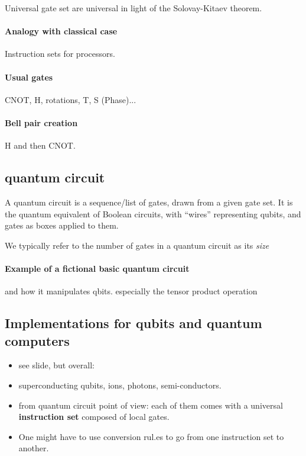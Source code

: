 \documentclass{article}
\begin{document}
Universal gate set are universal in light of the Solovay-Kitaev theorem.

\paragraph{Analogy with classical case} Instruction sets for processors.

\paragraph{Usual gates} CNOT, H, rotations, T, S (Phase)... 

\paragraph{Bell pair creation} H and then CNOT.

\subsection{quantum circuit}

A quantum circuit is a sequence/list of gates, drawn from a given gate set. It is the quantum
equivalent of Boolean circuits, with ``wires'' representing qubits, and gates as boxes
applied to them.

We typically refer to the number of gates in a quantum circuit as its \emph{size}

\paragraph{Example of a fictional basic quantum circuit} and how it manipulates
qbits. especially the tensor product operation

\subsection{Implementations for qubits and quantum computers}

\begin{itemize}
    \item see slide, but overall:
    \item superconducting qubits, ions, photons, semi-conductors.
    \item from quantum circuit point of view: each of them comes with a universal \textbf{instruction set}
    composed of local gates.
    \item One might have to use conversion rul.es to go from one instruction set to another.
\end{itemize}
\end{document}
